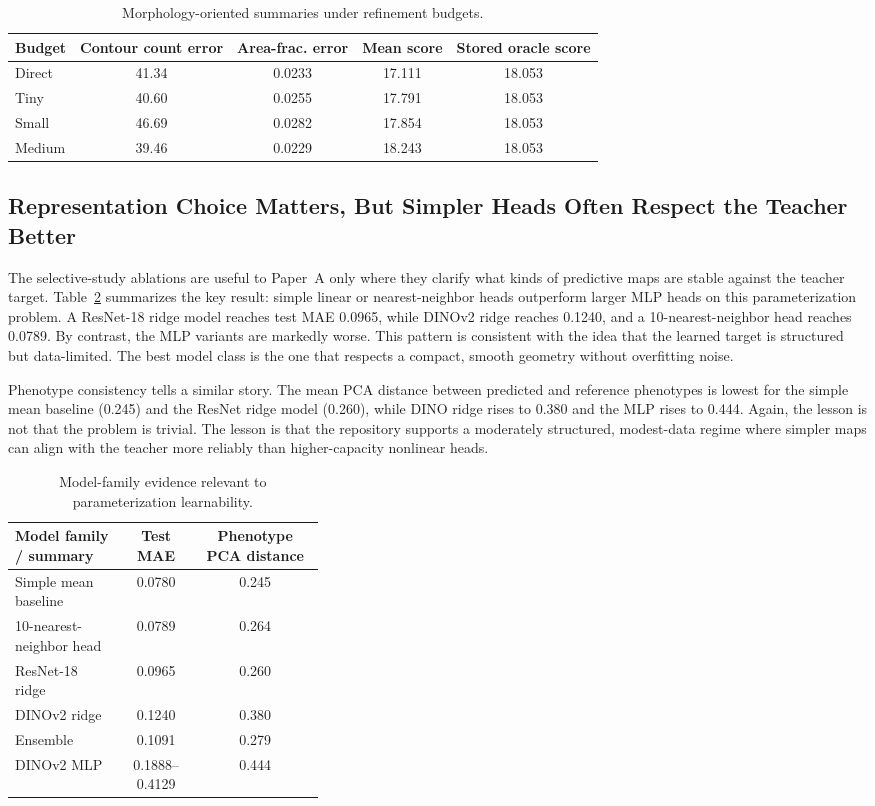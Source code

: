 \documentclass[11pt,a4paper]{article}
\begin{document}
\begin{table}[H]
\centering
\caption{Morphology-oriented summaries under refinement budgets.}
\label{tab:morph}
\small
\begin{tabular}{lcccc}
\toprule
Budget & Contour count error & Area-frac. error & Mean score & Stored oracle score \\
\midrule
Direct & 41.34 & 0.0233 & 17.111 & 18.053 \\
Tiny & 40.60 & 0.0255 & 17.791 & 18.053 \\
Small & 46.69 & 0.0282 & 17.854 & 18.053 \\
Medium & 39.46 & 0.0229 & 18.243 & 18.053 \\
\bottomrule
\end{tabular}
\end{table}

\subsection{Representation Choice Matters, But Simpler Heads Often Respect the Teacher Better}
The selective-study ablations are useful to Paper~A only where they clarify what kinds of predictive maps are stable against the teacher target.
Table~\ref{tab:repr} summarizes the key result: simple linear or nearest-neighbor heads outperform larger MLP heads on this parameterization problem.
A ResNet-18 ridge model reaches test MAE 0.0965, while DINOv2 ridge reaches 0.1240, and a 10-nearest-neighbor head reaches 0.0789.
By contrast, the MLP variants are markedly worse.
This pattern is consistent with the idea that the learned target is structured but data-limited.
The best model class is the one that respects a compact, smooth geometry without overfitting noise.

Phenotype consistency tells a similar story.
The mean PCA distance between predicted and reference phenotypes is lowest for the simple mean baseline (0.245) and the ResNet ridge model (0.260), while DINO ridge rises to 0.380 and the MLP rises to 0.444.
Again, the lesson is not that the problem is trivial.
The lesson is that the repository supports a moderately structured, modest-data regime where simpler maps can align with the teacher more reliably than higher-capacity nonlinear heads.

\begin{table}[H]
\centering
\caption{Model-family evidence relevant to parameterization learnability.}
\label{tab:repr}
\small
\begin{tabular}{p{0.36\linewidth}cc}
\toprule
Model family / summary & Test MAE & Phenotype PCA distance \\
\midrule
Simple mean baseline & 0.0780 & 0.245 \\
10-nearest-neighbor head & 0.0789 & 0.264 \\
ResNet-18 ridge & 0.0965 & 0.260 \\
DINOv2 ridge & 0.1240 & 0.380 \\
Ensemble & 0.1091 & 0.279 \\
DINOv2 MLP & 0.1888--0.4129 & 0.444 \\
\bottomrule
\end{tabular}
\end{table}
\end{document}
